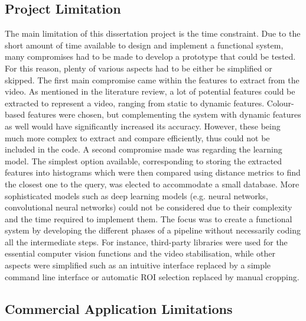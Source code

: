 \subsection{Project Limitation}

The main limitation of this dissertation project is the time constraint. Due to the short amount of time available to design and implement a functional system, many compromises had to be made to develop a prototype that could be tested. For this reason, plenty of various aspects had to be either be simplified or skipped. The first main compromise came within the features to extract from the video. As mentioned in the literature review, a lot of potential features could be extracted to represent a video, ranging from static to dynamic features. Colour-based features were chosen, but complementing the system with dynamic features as well would have significantly increased its accuracy. However, these being much more complex to extract and compare efficiently, thus could not be included in the code. A second compromise made was regarding the learning model. The simplest option available, corresponding to storing the extracted features into histograms which were then compared using distance metrics to find the closest one to the query, was elected to accommodate a small database. More sophisticated models such as deep learning models (e.g. neural networks, convolutional neural networks) could not be considered due to their complexity and the time required to implement them. The focus was to create a functional system by developing the different phases of a pipeline without necessarily coding all the intermediate steps. For instance, third-party libraries were used for the essential computer vision functions and the video stabilisation, while other aspects were simplified such as an intuitive interface replaced by a simple command line interface or automatic ROI selection replaced by manual cropping.

\subsection{Commercial Application Limitations}

